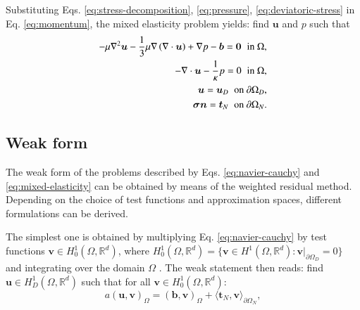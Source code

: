 \documentclass[english,11pt,3p,number,sort&compress]{elsarticle}
\begin{document}
Substituting Eqs. \eqref{eq:stress-decomposition}, \eqref{eq:pressure}, \eqref{eq:deviatoric-stress} in Eq. \eqref{eq:momentum}, the mixed elasticity problem yields: find $\mathbf{u}$ and $p$ such that
\begin{subequations} \label{eq:mixed-elasticity}
	\begin{align}
		-\mu\nabla^2\bm{u} -\frac{1}{3}\mu\nabla\left(\nabla \cdot \bm{u} \right) + \nabla p -\bm{b}= \bm{0} \hspace{0.2cm} \text{in } \Omega ,& \label{eq:mixed-elasticity-a}\\ 
		-\nabla \cdot \bm{u} -\frac{1}{\kappa}p= 0 \hspace{0.2cm} \text{in } \Omega ,& \label{eq:mixed-elasticity-b}\\ 
		\bm{u} = \bm{u}_D \hspace{0.2cm} \text{on } \partial\Omega_D ,&\\
		\bm{\sigma} \bm{n} = \bm{t}_N \hspace{0.2cm} \text{on } \partial\Omega_N .&
	\end{align}
\end{subequations}

\subsection{Weak form}

The weak form of the problems described by Eqs. \eqref{eq:navier-cauchy} and \eqref{eq:mixed-elasticity} can be obtained by means of the weighted residual method. Depending on the choice of test functions and approximation spaces, different formulations can be derived.

The simplest one is obtained by multiplying Eq. \eqref{eq:navier-cauchy} by test functions $\bm{v} \in H^1_0(\Omega,\mathbb{R}^d)$, where $H^1_0(\Omega,\mathbb{R}^d)=\{\bm{v} \in H^1(\Omega,\mathbb{R}^d) : \bm{v} \lvert_{\partial\Omega_D}=0 \}$ and integrating over the domain $\Omega$ \cite{becker1981finite}. The weak statement then reads: find $\mathbf{u} \in H^1_D(\Omega,\mathbb{R}^d)$ such that for all $\mathbf{v} \in H^1_0(\Omega,\mathbb{R}^d)$:
\begin{equation} \label{eq:weak-primal-displacement}
    a\left(\bm{u},\bm{v}\right)_\Omega = \left(\bm{b},\bm{v}\right)_\Omega + \langle\bm{t}_N,\bm{v}\rangle_{\partial\Omega_N},
\end{equation}
\end{document}
